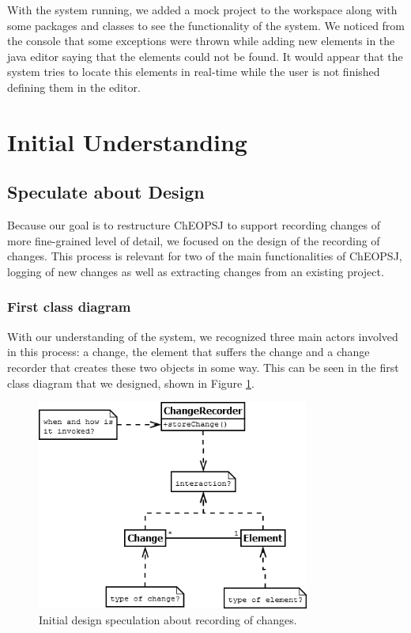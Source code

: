 \documentclass{article}
\begin{document}
With the system running, we added a mock project to the workspace along with some packages and classes to see the functionality of the system. We noticed from the console that some exceptions were thrown while adding new elements in the java editor saying that the elements could not be found. It would appear that the system tries to locate this elements in real-time while the user is not finished defining them in the editor.

\section{Initial Understanding}

\subsection{Speculate about Design}
Because our goal is to restructure ChEOPSJ to support recording changes of more fine-grained level of detail, we focused on the design of the recording of changes. This process is relevant for two of the main functionalities of ChEOPSJ, logging of new changes as well as extracting changes from an existing project.

\subsubsection{First class diagram}
With our understanding of the system, we recognized three main actors involved in this process: a change, the element that suffers the change and a change recorder that creates these two objects in some way. This can be seen in the first class diagram that we designed, shown in Figure \ref{fig:spec1}.

\begin{figure}[h]
\centering
\includegraphics[width=0.8\textwidth]{Images/spec0}
\caption{Initial design speculation about recording of changes.}
\label{fig:spec1}
\end{figure}
\end{document}
